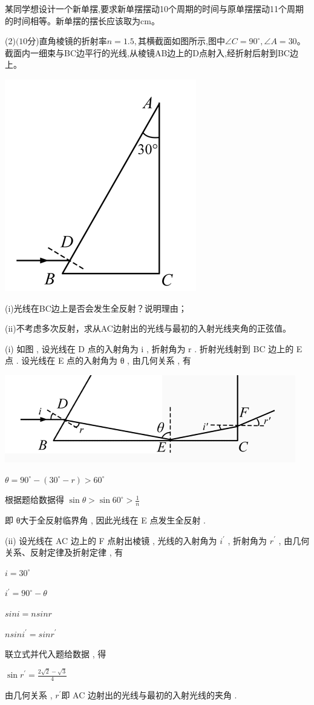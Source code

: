 某同学想设计一个新单摆,要求新单摆摆动10个周期的时间与原单摆摆动11个周期的时间相等。新单摆的摆长应该取为cm。

(2)$(10$分)直角棱镜的折射率$n=1.5,$其横截面如图所示,图中$∠C=90^∘,∠A=30$。截面内一细束与BC边平行的光线,从棱镜AB边上的D点射入,经折射后射到BC边上。
\begin{center}
    \includegraphics[]{img/image10.png}
    \end{center}
(i)光线在BC边上是否会发生全反射？说明理由；

(ii)不考虑多次反射，求从AC边射出的光线与最初的入射光线夹角的正弦值。
\begin{solution}{4cm}
(i)
如图 , 设光线在 D 点的入射角为 i , 折射角为 r . 折射光线射到 BC 边上的 E 点 . 设光线在 E 点的入射角为 θ , 由几何关系 , 有
\begin{center}
    \includegraphics[]{img/imgageA2.png}
\end{center}
$θ = 90 ^∘ - ( 30^∘ - r ) > 60^∘$ 

根据题给数据得 $\sin \theta > \sin 60^{ \circ }> \frac{1}{n}$ 

即 θ大于全反射临界角 , 因此光线在 E 点发生全反射 .   

(ii)
设光线在 AC 边上的 F 点射出棱镜 , 光线的入射角为 $i^\prime$ , 折射角为 $r^\prime$ , 由几何关系、反射定律及折射定律 , 有

$i = 30 ^∘$

$i^\prime = 90^∘ - θ$

$sin i = nsinr$ 

$nsini^\prime = sinr ^\prime$ 

联立式并代入题给数据 , 得 

$\sin r^{ \prime }= \frac{2 \sqrt{2}- \sqrt{3}}{4} $

由几何关系 , $r^\prime$即 AC 边射出的光线与最初的入射光线的夹角 .
\end{solution}

